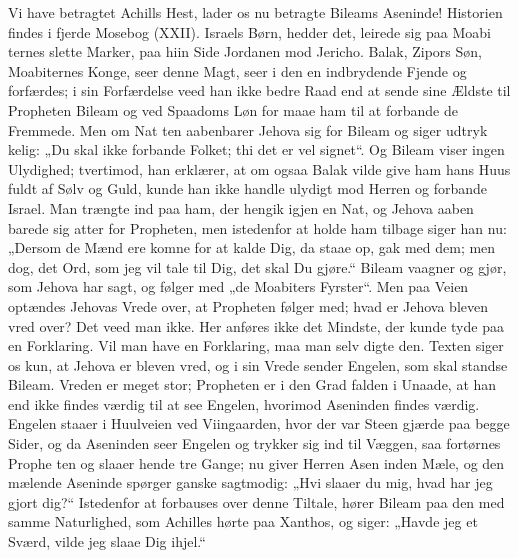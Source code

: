 \documentclass[12pt]{book}
\newcommand{\opage}[1]{\marginnote{\footnotesize\textit{[#1]}}}
\begin{document}
Vi have betragtet Achills Hest, lader os nu betragte
Bileams Aseninde! Historien findes i fjerde Mosebog
(XXII). Israels Børn, hedder det, leirede sig paa Moabi\-%
ternes slette Marker, paa hiin Side Jordanen mod Jericho.
Balak, Zipors Søn, Moabiternes Konge, seer denne Magt,
seer i den en indbrydende Fjende og forfærdes; i sin
Forfærdelse veed han ikke bedre Raad end at sende sine
Ældste til Propheten Bileam og ved Spaadoms Løn for\-%
maae ham til at forbande de Fremmede. Men om Nat\-%
ten aabenbarer Jehova sig for Bileam og siger udtryk\-%
kelig: „Du skal ikke forbande Folket; thi det er vel\-%
signet“. Og Bileam viser ingen Ulydighed; tvertimod,
han erklærer, at om ogsaa Balak vilde give ham hans
Huus fuldt af Sølv og Guld, kunde han ikke handle
ulydigt mod Herren og forbande Israel. Man trængte
ind paa ham, der hengik igjen en Nat, og Jehova aaben\-%
barede sig atter for Propheten, men istedenfor at holde
ham tilbage siger han nu: „Dersom de Mænd ere komne
for at kalde Dig, da staae op, gak med dem; men dog,
det Ord, som jeg vil tale til Dig, det skal Du gjøre.“
Bileam vaagner og gjør, som Jehova har sagt, og følger
med „de Moabiters Fyrster“. Men paa Veien optændes
Jehovas Vrede over, at Propheten følger med; hvad er
Jehova bleven vred over? Det veed man ikke. Her
anføres ikke det Mindste, der kunde tyde paa en
Forklaring. Vil man have en Forklaring, maa man selv
digte den. Texten siger os kun, at Jehova er bleven
vred, og i sin Vrede sender Engelen, som skal standse
Bileam. Vreden er meget stor; Propheten er i den Grad
falden i Unaade, at han end ikke findes værdig til at see
\opage{158}\setcounter{footnote}{0}%
Engelen, hvorimod Aseninden findes værdig. Engelen
staaer i Huulveien ved Viingaarden, hvor der var Steen\-%
gjærde paa begge Sider, og da Aseninden seer Engelen
og trykker sig ind til Væggen, saa fortørnes Prophe\-%
ten og slaaer hende tre Gange; nu giver Herren Asen\-%
inden Mæle, og den mælende Aseninde spørger ganske
sagtmodig: „Hvi slaaer du mig, hvad har jeg gjort dig?“
Istedenfor at forbauses over denne Tiltale, hører Bileam
paa den med samme Naturlighed, som Achilles hørte paa
Xanthos, og siger: „Havde jeg et Sværd, vilde jeg slaae
Dig ihjel.“
\end{document}
